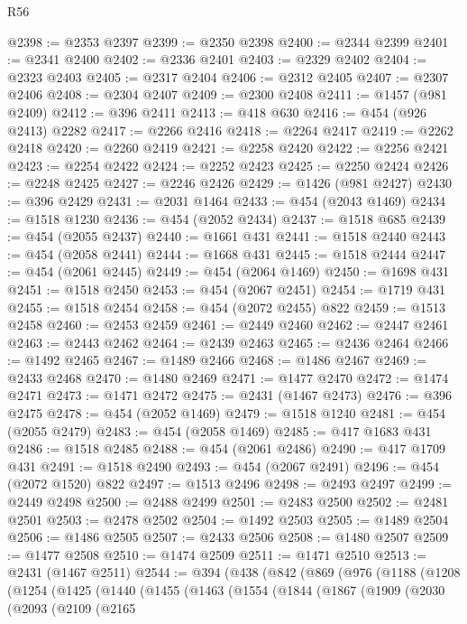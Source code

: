 \begin{lexlean}{R56}
\begin{coremodule}
@2398 := @2353 @2397
@2399 := @2350 @2398
@2400 := @2344 @2399
@2401 := @2341 @2400
@2402 := @2336 @2401
@2403 := @2329 @2402
@2404 := @2323 @2403
@2405 := @2317 @2404
@2406 := @2312 @2405
@2407 := @2307 @2406
@2408 := @2304 @2407
@2409 := @2300 @2408
@2411 := @1457 (@981 @2409)
@2412 := @396 @2411
@2413 := @418 @630
@2416 := @454 (@926 @2413) @2282
@2417 := @2266 @2416
@2418 := @2264 @2417
@2419 := @2262 @2418
@2420 := @2260 @2419
@2421 := @2258 @2420
@2422 := @2256 @2421
@2423 := @2254 @2422
@2424 := @2252 @2423
@2425 := @2250 @2424
@2426 := @2248 @2425
@2427 := @2246 @2426
@2429 := @1426 (@981 @2427)
@2430 := @396 @2429
@2431 := @2031 @1464
@2433 := @454 (@2043 @1469)
@2434 := @1518 @1230
@2436 := @454 (@2052 @2434)
@2437 := @1518 @685
@2439 := @454 (@2055 @2437)
@2440 := @1661 @431
@2441 := @1518 @2440
@2443 := @454 (@2058 @2441)
@2444 := @1668 @431
@2445 := @1518 @2444
@2447 := @454 (@2061 @2445)
@2449 := @454 (@2064 @1469)
@2450 := @1698 @431
@2451 := @1518 @2450
@2453 := @454 (@2067 @2451)
@2454 := @1719 @431
@2455 := @1518 @2454
@2458 := @454 (@2072 @2455) @822
@2459 := @1513 @2458
@2460 := @2453 @2459
@2461 := @2449 @2460
@2462 := @2447 @2461
@2463 := @2443 @2462
@2464 := @2439 @2463
@2465 := @2436 @2464
@2466 := @1492 @2465
@2467 := @1489 @2466
@2468 := @1486 @2467
@2469 := @2433 @2468
@2470 := @1480 @2469
@2471 := @1477 @2470
@2472 := @1474 @2471
@2473 := @1471 @2472
@2475 := @2431 (@1467 @2473)
@2476 := @396 @2475
@2478 := @454 (@2052 @1469)
@2479 := @1518 @1240
@2481 := @454 (@2055 @2479)
@2483 := @454 (@2058 @1469)
@2485 := @417 @1683 @431
@2486 := @1518 @2485
@2488 := @454 (@2061 @2486)
@2490 := @417 @1709 @431
@2491 := @1518 @2490
@2493 := @454 (@2067 @2491)
@2496 := @454 (@2072 @1520) @822
@2497 := @1513 @2496
@2498 := @2493 @2497
@2499 := @2449 @2498
@2500 := @2488 @2499
@2501 := @2483 @2500
@2502 := @2481 @2501
@2503 := @2478 @2502
@2504 := @1492 @2503
@2505 := @1489 @2504
@2506 := @1486 @2505
@2507 := @2433 @2506
@2508 := @1480 @2507
@2509 := @1477 @2508
@2510 := @1474 @2509
@2511 := @1471 @2510
@2513 := @2431 (@1467 @2511)
@2544 := @394
    (@438
      (@842
        (@869
          (@976
            (@1188
              (@1208
                (@1254
                  (@1425
                    (@1440
                      (@1455
                        (@1463
                          (@1554
                            (@1844
                              (@1867
                                (@1909
                                  (@2030
                                    (@2093
                                      (@2109
                                        (@2165

\end{coremodule}
\end{lexlean}
